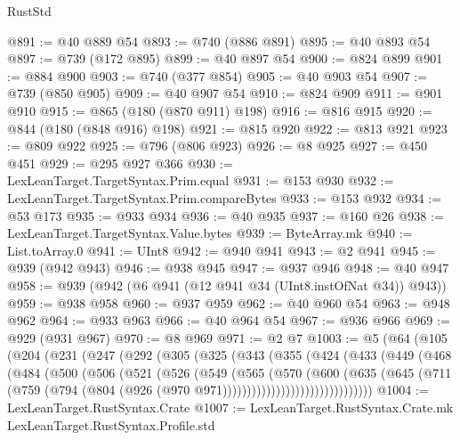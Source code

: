 \begin{lexlean}{RustStd}
\begin{coremodule}
@891 := @40 @889 @54
@893 := @740 (@886 @891)
@895 := @40 @893 @54
@897 := @739 (@172 @895)
@899 := @40 @897 @54
@900 := @824 @899
@901 := @884 @900
@903 := @740 (@377 @854)
@905 := @40 @903 @54
@907 := @739 (@850 @905)
@909 := @40 @907 @54
@910 := @824 @909
@911 := @901 @910
@915 := @865 (@180 (@870 @911) @198)
@916 := @816 @915
@920 := @844 (@180 (@848 @916) @198)
@921 := @815 @920
@922 := @813 @921
@923 := @809 @922
@925 := @796 (@806 @923)
@926 := @8 @925
@927 := @450 @451
@929 := @295 @927 @366
@930 := LexLeanTarget.TargetSyntax.Prim.equal
@931 := @153 @930
@932 := LexLeanTarget.TargetSyntax.Prim.compareBytes
@933 := @153 @932
@934 := @53 @173
@935 := @933 @934
@936 := @40 @935
@937 := @160 @26
@938 := LexLeanTarget.TargetSyntax.Value.bytes
@939 := ByteArray.mk
@940 := List.toArray.{0}
@941 := UInt8
@942 := @940 @941
@943 := @2 @941
@945 := @939 (@942 @943)
@946 := @938 @945
@947 := @937 @946
@948 := @40 @947
@958 := @939 (@942 (@6 @941 (@12 @941 @34 (UInt8.instOfNat @34)) @943))
@959 := @938 @958
@960 := @937 @959
@962 := @40 @960 @54
@963 := @948 @962
@964 := @933 @963
@966 := @40 @964 @54
@967 := @936 @966
@969 := @929 (@931 @967)
@970 := @8 @969
@971 := @2 @7
@1003 := @5
    (@64
      (@105
        (@204
          (@231
            (@247
              (@292
                (@305
                  (@325
                    (@343
                      (@355
                        (@424
                          (@433
                            (@449
                              (@468
                                (@484
                                  (@500
                                    (@506
                                      (@521
                                        (@526
                                          (@549
                                            (@565
                                              (@570
                                                (@600
                                                  (@635
                                                    (@645
                                                      (@711
                                                        (@759
                                                          (@794
                                                            (@804
                                                              (@926
                                                                (@970
                                                                  @971)))))))))))))))))))))))))))))))
@1004 := LexLeanTarget.RustSyntax.Crate
@1007 := LexLeanTarget.RustSyntax.Crate.mk LexLeanTarget.RustSyntax.Profile.std

\end{coremodule}
\end{lexlean}
